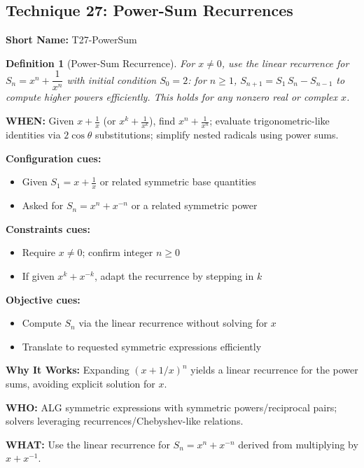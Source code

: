 \documentclass[12pt]{article}
\newtheorem{definition}{Definition}[section]
\begin{document}
\subsection{Technique 27: Power-Sum Recurrences}
\textbf{Short Name:} T27-PowerSum

\begin{definition}[Power-Sum Recurrence]
For $x \ne 0$, use the linear recurrence for $S_n = x^n + \dfrac{1}{x^n}$ with initial condition $S_0 = 2$: for $n \ge 1$, $S_{n+1} = S_1\,S_n - S_{n-1}$ to compute higher powers efficiently.
This holds for any nonzero real or complex $x$.
\end{definition}

\textbf{WHEN:} Given $x+\tfrac{1}{x}$ (or $x^k+\tfrac{1}{x^k}$), find $x^n+\tfrac{1}{x^n}$; evaluate trigonometric-like identities via $2\cos\theta$ substitutions; simplify nested radicals using power sums.

\textbf{Configuration cues:}
\begin{itemize}
    \item Given $S_1 = x + \tfrac{1}{x}$ or related symmetric base quantities
    \item Asked for $S_n = x^n + x^{-n}$ or a related symmetric power
\end{itemize}

\textbf{Constraints cues:}
\begin{itemize}
    \item Require $x \ne 0$; confirm integer $n \ge 0$
    \item If given $x^k + x^{-k}$, adapt the recurrence by stepping in $k$
\end{itemize}

\textbf{Objective cues:}
\begin{itemize}
    \item Compute $S_n$ via the linear recurrence without solving for $x$
    \item Translate to requested symmetric expressions efficiently
\end{itemize}

\textbf{Why It Works:} Expanding $(x + 1/x)^n$ yields a linear recurrence for the power sums, avoiding explicit solution for $x$.

\textbf{WHO:} ALG symmetric expressions with symmetric powers/reciprocal pairs; solvers leveraging recurrences/Chebyshev-like relations.

\textbf{WHAT:} Use the linear recurrence for $S_n = x^n + x^{-n}$ derived from multiplying by $x + x^{-1}$.
\end{document}
